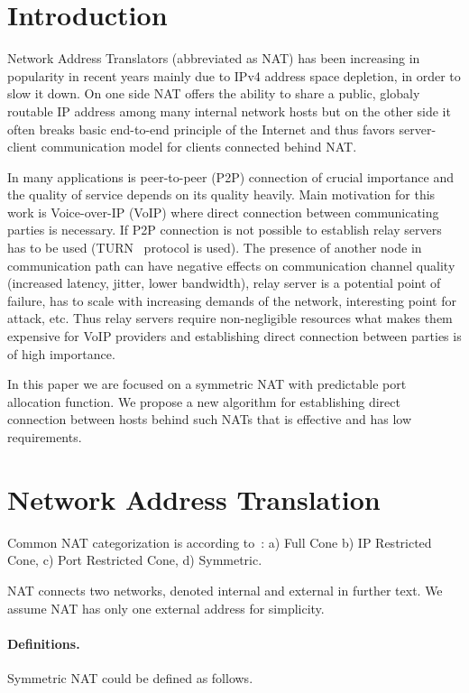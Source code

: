 \documentclass[twoside]{article}
\begin{document}
\begin{multicols}{2}

\section{Introduction}
Network Address Translators (abbreviated as NAT) has been increasing in popularity in recent years 
mainly due to IPv4 address space depletion, in order to slow it down. On one side NAT offers
the ability to share a public, globaly routable IP address among many internal network hosts but on 
the other side it often breaks basic end-to-end principle of the Internet and thus favors server-client 
communication model for clients connected behind NAT.

In many applications is peer-to-peer (P2P) connection of crucial importance and the quality of service depends on 
its quality heavily. Main motivation for this work is Voice-over-IP (VoIP) where direct connection 
between communicating parties is necessary. If P2P connection is not possible to establish relay 
servers has to be used (TURN~\citep{rfc5766} protocol is used). The presence 
of another node in communication path can have negative effects on communication channel quality 
(increased latency, jitter, lower bandwidth), relay server is a potential point of failure, 
has to scale with increasing demands of the network, interesting point for attack, etc.
Thus relay servers require non-negligible resources what makes them expensive for VoIP providers and
establishing direct connection between parties is of high importance.

In this paper we are focused on a symmetric NAT with predictable port allocation function. We propose a 
new algorithm for establishing direct connection between hosts behind such NATs that is effective and 
has low requirements.

\section{Network Address Translation}
Common NAT categorization is according to~\citep{rfc3489}: a) Full Cone
b) IP Restricted Cone, c) Port Restricted Cone, d) Symmetric.

NAT connects two networks, denoted internal and external in further text. We assume NAT has only 
one external address for simplicity. 

\paragraph{Definitions.}
Symmetric NAT could be defined as follows.


\end{multicols}
\end{document}
